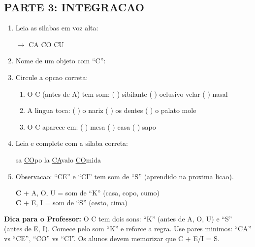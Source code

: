 \begin{exercicio}
\subsection*{PARTE 3: INTEGRACAO}

\begin{enumerate}[resume]
  \item Leia as silabas em voz alta:
  \begin{center}
  $\rightarrow$ CA \quad CO \quad CU
  \end{center}

  \item Nome de um objeto com ``C'':
  \begin{center}
  \underline{\hspace{6cm}}
  \end{center}

  \item Circule a opcao correta:
  \begin{enumerate}[label=(\alph*)]
    \item O C (antes de A) tem som: ( ) sibilante ( ) oclusivo velar ( ) nasal
    \item A lingua toca: ( ) o nariz ( ) os dentes ( ) o palato mole
    \item O C aparece em: ( ) mesa ( ) casa ( ) sapo
  \end{enumerate}

  \item Leia e complete com a silaba correta:
  \begin{center}
  sa \quad \underline{CO}po \quad {}la \quad \underline{CA}valo \quad \underline{CO}mida
  \end{center}

  \item Observacao: ``CE'' e ``CI'' tem som de ``S'' (aprendido na proxima licao).
  \begin{center}
  \textbf{C} + A, O, U = som de ``K'' (casa, copo, cumo)\\
  \textbf{C} + E, I = som de ``S'' (cesto, cima)
  \end{center}
\end{enumerate}
\end{exercicio}

\begin{dica}
\textbf{Dica para o Professor:} O C tem dois sons: ``K'' (antes de A, O, U) e ``S'' (antes de E, I). Comece pelo som ``K'' e reforce a regra. Use pares minimos: ``CA'' vs ``CE'', ``CO'' vs ``CI''. Os alunos devem memorizar que C + E/I = S.
\end{dica}

